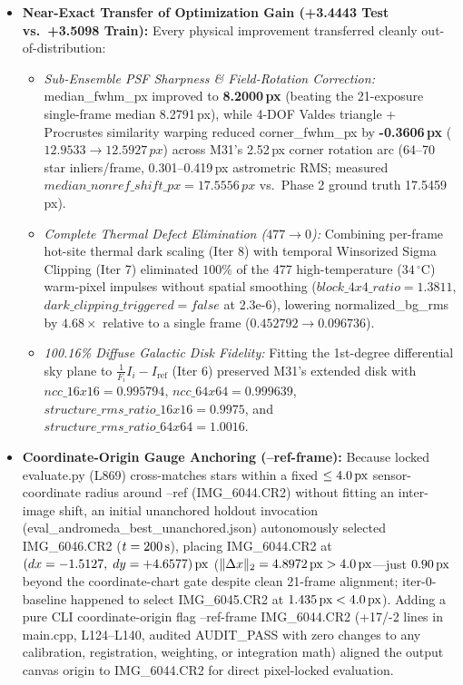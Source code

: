 \documentclass[10pt,twocolumn,letterpaper]{article}
\DeclareRobustCommand{\code}[1]{\texttt{#1}}
\def\code#1{#1}%
\def\bm#1{#1}%
\def\allowbreak{}%
\begin{document}
\begin{itemize}
  \item \textbf{Near-Exact Transfer of Optimization Gain (\code{+3.4443} Test vs.\ \code{+3.5098} Train):} Every physical improvement transferred cleanly out-of-distribution:
  \begin{itemize}
    \item \emph{Sub-Ensemble PSF Sharpness \& Field-Rotation Correction:} \code{median\_fwhm\_px} improved to \textbf{\code{8.2000\,px}} (beating the 21-exposure single-frame median \code{8.2791\,px}), while 4-DOF Valdes triangle + Procrustes similarity warping reduced \code{corner\_fwhm\_px} by \textbf{\code{-0.3606\,px}} ($\code{12.9533} \to \code{12.5927\,px}$) across M31's \code{2.52\,px} corner rotation arc (\code{64--70} star inliers/frame, \code{0.301--0.419\,px} astrometric RMS; measured $\code{median\_nonref\_shift\_px} = \code{17.5556\,px}$ vs.\ Phase 2 ground truth \code{17.5459\,px}).
    \item \emph{Complete Thermal Defect Elimination ($\code{477} \to \code{0}$):} Combining per-frame hot-site thermal dark scaling (\code{Iter 8}) with temporal Winsorized Sigma Clipping (\code{Iter 7}) eliminated $100\%$ of the \code{477} high-temperature ($34\,^\circ\text{C}$) warm-pixel impulses without spatial smoothing ($\code{block\_4x4\_ratio} = \code{1.3811}$, $\code{dark\_clipping\_triggered} = \code{false}$ at \code{2.3e-6}), lowering \code{normalized\_bg\_rms} by $4.68\times$ relative to a single frame ($\code{0.452792} \to \code{0.096736}$).
    \item \emph{100.16\% Diffuse Galactic Disk Fidelity:} Fitting the 1st-degree differential sky plane to $\frac{1}{F_i}I_i - I_{\text{ref}}$ (\code{Iter 6}) preserved M31's extended disk with $\code{ncc\_16x16} = \code{0.995794}$, $\code{ncc\_64x64} = \code{0.999639}$, $\code{structure\_rms\_ratio\_16x16} = \code{0.9975}$, and $\code{structure\_rms\_ratio\_64x64} = \code{1.0016}$.
  \end{itemize}
  \item \textbf{Coordinate-Origin Gauge Anchoring (\code{--ref-frame}):} Because locked \code{evaluate.py} (L869) cross-matches stars within a fixed $\le 4.0\text{\,px}$ sensor-coordinate radius around \code{--ref} (\code{IMG\_6044.CR2}) without fitting an inter-image shift, an initial unanchored holdout invocation (\code{eval\_\allowbreak andromeda\_\allowbreak best\_\allowbreak unanchored.json}) autonomously selected \code{IMG\_6046.CR2} ($t = 200\text{\,s}$), placing \code{IMG\_6044.CR2} at $(\code{dx} = -1.5127,\; \code{dy} = +4.6577)\text{\,px}$ ($\|\Delta\bm{x}\|_2 = 4.8972\text{\,px} > 4.0\text{\,px}$---just $0.90\text{\,px}$ beyond the coordinate-chart gate despite clean 21-frame alignment; \code{iter-0-baseline} happened to select \code{IMG\_6045.CR2} at $1.435\text{\,px} < 4.0\text{\,px}$). Adding a pure CLI coordinate-origin flag \code{--ref-frame IMG\_6044.CR2} (\code{+17/-2} lines in \code{main.cpp}, L124--L140, audited \code{AUDIT\_PASS} with zero changes to any calibration, registration, weighting, or integration math) aligned the output canvas origin to \code{IMG\_6044.CR2} for direct pixel-locked evaluation.
\end{itemize}
\end{document}
